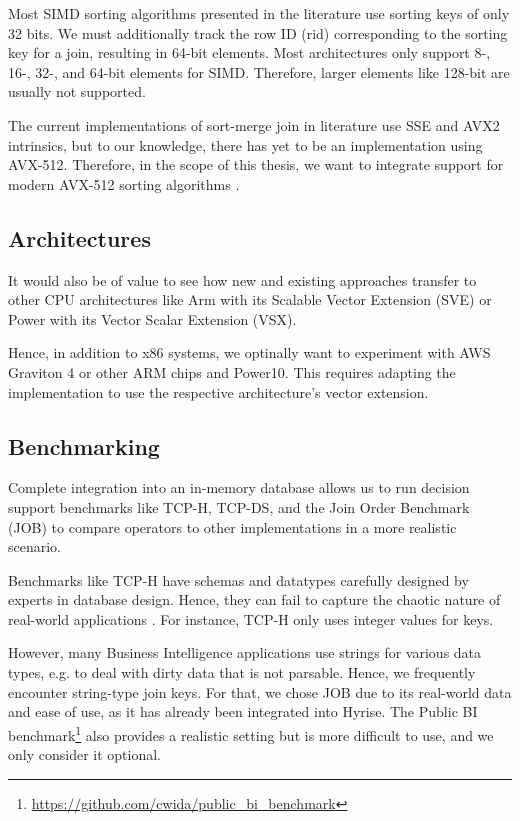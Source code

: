 Most SIMD sorting algorithms presented in the literature use sorting keys of only 32 bits. We must additionally track the row ID
(rid) corresponding to the sorting key for a join, resulting in 64-bit elements. Most architectures
only support 8-, 16-, 32-, and 64-bit elements for SIMD. Therefore, larger elements like 128-bit are
usually not supported.

The current implementations of sort-merge join in literature use SSE and AVX2 intrinsics, but to
our knowledge, there has yet to be an implementation using AVX-512. Therefore, in the scope of
this thesis, we want to integrate support for modern AVX-512 sorting algorithms \cite{Watkins, 8855628}. 

\subsection{Architectures}
It would also be of value to see how new and existing approaches transfer to other CPU
architectures like Arm with its Scalable Vector Extension (SVE) or Power with its Vector Scalar
Extension (VSX).

Hence, in addition to x86 systems, we optinally want to experiment with AWS Graviton 4 or other ARM chips
and Power10. This requires adapting 
the implementation to use the respective architecture's
vector extension.


\subsection{Benchmarking}
Complete integration into an in-memory database allows us to run decision support benchmarks
like TCP-H, TCP-DS, and the Join Order Benchmark (JOB) \cite{DBLP:journals/pvldb/LeisGMBK015} to
compare operators to other implementations in a more realistic scenario.

Benchmarks like TCP-H have schemas and datatypes carefully designed by experts in database design.
Hence, they can fail to capture the chaotic nature of real-world applications \cite{10.1145/3209950.3209952}.
For instance, TCP-H only uses integer values for keys. 

However, many Business Intelligence applications use strings for various data types, e.g. to deal
with dirty data that is not parsable. Hence, we frequently encounter string-type join keys. For
that, we chose JOB due to its real-world data and ease of use, as it 
has already been integrated into Hyrise. The Public BI benchmark\footnote{\url{https://github.com/cwida/public_bi_benchmark}}
also provides a realistic setting
but is more difficult to use, and we only consider it optional.

